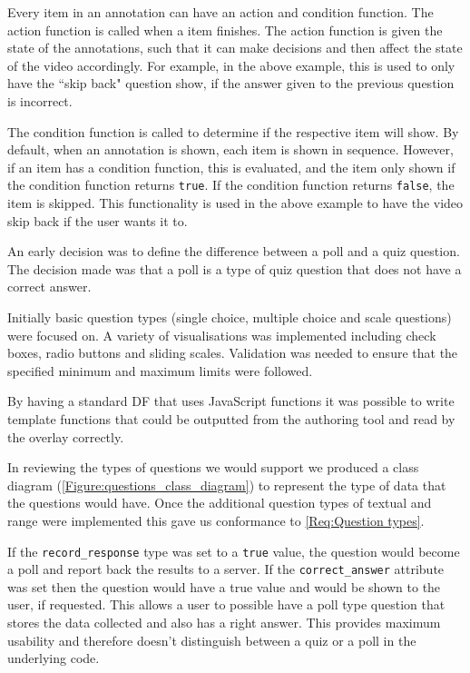 Every item in an annotation can have an action and condition function. The action function is called when a item finishes. The action function is given the state of the annotations, such that it can make decisions and then affect the state of the video accordingly. For example, in the above example, this is used to only have the ``skip back" question show, if the answer given to the previous question is incorrect.

The condition function is called to determine if the respective item will show. By default, when an annotation is shown, each item is shown in sequence. However, if an item has a condition function, this is evaluated, and the item only shown if the condition function returns \lstinline|true|. If the condition function returns \lstinline|false|, the item is skipped. This functionality is used in the above example to have the video skip back if the user wants it to.

An early decision was to define the difference between a poll and a quiz question. The decision made was that a poll is a type of quiz question that does not have a correct answer.

Initially basic question types (single choice, multiple choice and scale questions) were focused on. A variety of visualisations was implemented including check boxes, radio buttons and sliding scales. Validation was needed to ensure that the specified minimum and maximum limits were followed.

By having a standard \gls{DF} that uses JavaScript functions it was possible to write template functions that could be outputted from the authoring tool and read by the overlay correctly.

In reviewing the types of questions we would support we produced a class diagram (\autoref{Figure:questions_class_diagram}) to represent the type of data that the questions would have. Once the additional question types of textual and range were implemented this gave us conformance to \cref{Req:Question types}.

If the \lstinline|record_response| type was set to a \lstinline|true| value, the question would become a poll and report back the results to a server. If the \lstinline|correct_answer| attribute was set then the question would have a true value and would be shown to the user, if requested. This allows a user to possible have a poll type question that stores the data collected and also has a right answer. This provides maximum usability and therefore doesn't distinguish between a quiz or a poll in the underlying code.

